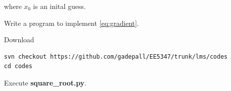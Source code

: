 \documentclass[journal,12pt,twocolumn]{IEEEtran}
\begin{document}
%
where $x_0$ is an inital guess.
%
\begin{problem}
Write a program to implement \eqref{eq:gradient}.
\end{problem}
%
\solution Download
\begin{lstlisting}
svn checkout https://github.com/gadepall/EE5347/trunk/lms/codes
cd codes
\end{lstlisting}
Execute \textbf{square\_root.py}.
\end{document}
